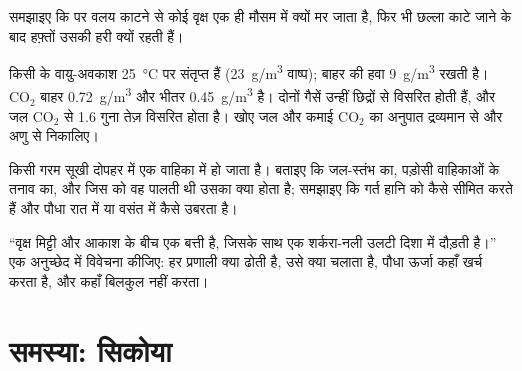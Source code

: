\begin{exercise}[$\star\star$]\label{exo:b1:plant-transport:9}
समझाइए कि  पर वलय काटने से कोई वृक्ष एक ही मौसम में क्यों मर जाता है,
फिर भी छल्ला काटे जाने के बाद हफ़्तों उसकी  हरी क्यों रहती हैं।
\end{exercise}

\begin{exercise}[$\star\star\star$]\label{exo:b1:plant-transport:10}
किसी  के वायु-अवकाश \qty{25}{\celsius} पर संतृप्त हैं
(\qty{23}{g/m^3} वाष्प); बाहर की हवा \qty{9}{g/m^3} रखती है।
$\mathrm{CO_2}$ बाहर \qty{0.72}{g/m^3} और भीतर \qty{0.45}{g/m^3} है।
दोनों गैसें उन्हीं छिद्रों से विसरित होती हैं, और जल $\mathrm{CO_2}$ से
1.6 गुना तेज़ विसरित होता है। खोए जल और कमाई $\mathrm{CO_2}$ का अनुपात
द्रव्यमान से और अणु से निकालिए।
\end{exercise}

\begin{exercise}[$\star\star\star$]\label{exo:b1:plant-transport:11}
किसी गरम सूखी दोपहर में एक वाहिका में  हो जाता है। बताइए कि
जल-स्तंभ का, पड़ोसी वाहिकाओं के तनाव का, और जिस  को वह पालती थी
उसका क्या होता है; समझाइए कि गर्त हानि को कैसे सीमित करते हैं और पौधा
रात में या वसंत में कैसे उबरता है।
\end{exercise}

\begin{exercise}[$\star\star\star$]\label{exo:b1:plant-transport:12}
``वृक्ष मिट्टी और आकाश के बीच एक बत्ती है, जिसके साथ एक शर्करा-नली उलटी
दिशा में दौड़ती है।'' एक अनुच्छेद में विवेचना कीजिए: हर प्रणाली क्या
ढोती है, उसे क्या चलाता है, पौधा ऊर्जा कहाँ खर्च करता है, और कहाँ
बिलकुल नहीं करता।
\end{exercise}

\section{समस्या: सिकोया}

